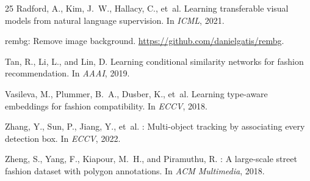 \documentclass[10pt,twocolumn]{article}
\begin{document}
\begin{thebibliography}{25}
Radford, A., Kim, J.~W., Hallacy, C., et~al.
\newblock Learning transferable visual models from natural language supervision.
\newblock In \emph{ICML}, 2021.

rembg: Remove image background.
\newblock \url{https://github.com/danielgatis/rembg}.

Tan, R., Li, L., and Lin, D.
\newblock Learning conditional similarity networks for fashion recommendation.
\newblock In \emph{AAAI}, 2019.

Vasileva, M., Plummer, B.~A., Dusber, K., et~al.
\newblock Learning type-aware embeddings for fashion compatibility.
\newblock In \emph{ECCV}, 2018.

Zhang, Y., Sun, P., Jiang, Y., et~al.
: Multi-object tracking by associating every detection
box.
\newblock In \emph{ECCV}, 2022.

Zheng, S., Yang, F., Kiapour, M.~H., and Piramuthu, R.
: A large-scale street fashion dataset with polygon
annotations.
\newblock In \emph{ACM Multimedia}, 2018.

\end{thebibliography}
\end{document}
